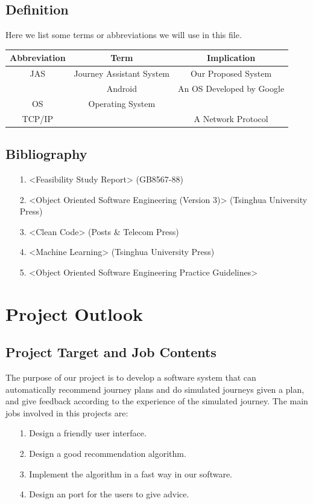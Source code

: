 \documentclass[10pt]{article}
\begin{document}
\subsection{Definition}
Here we list some terms or abbreviations we will use in this file.

\begin{center}
\begin{tabular}{|c|c|c|} 
	\hline 
	Abbreviation&Term&Implication\\
	\hline  
	JAS&Journey Assistant System&Our Proposed System\\
	\hline 
	 &Android&An OS Developed by Google\\
	\hline
	OS&Operating System& \\
	\hline
	TCP/IP& &A Network Protocol\\
	\hline
\end{tabular}    
\end{center}

\subsection{Bibliography}
\begin{itemize}
	\item[1.] <Feasibility Study Report> (GB8567-88)
	\item[2.] <Object Oriented Software Engineering (Version 3)> (Tsinghua University Press)
	\item[3.] <Clean Code> (Posts \& Telecom Press)
	\item[4.] <Machine Learning> (Tsinghua University Press)
	\item[5.] <Object Oriented Software Engineering Practice Guidelines> 
\end{itemize}

\section{Project Outlook}
\subsection{Project Target and Job Contents}
The purpose of our project is to develop a software system that can automatically recommend journey plans and do simulated journeys given a plan, and give feedback according to the experience of the simulated journey. The main jobs involved in this projects are:

\begin{itemize}
	\item[1.] Design a friendly user interface.
	\item[2.] Design a good recommendation algorithm.
	\item[3.] Implement the algorithm in a fast way in our software.
	\item[4.] Design an port for the users to give advice.
\end{itemize}
\end{document}
